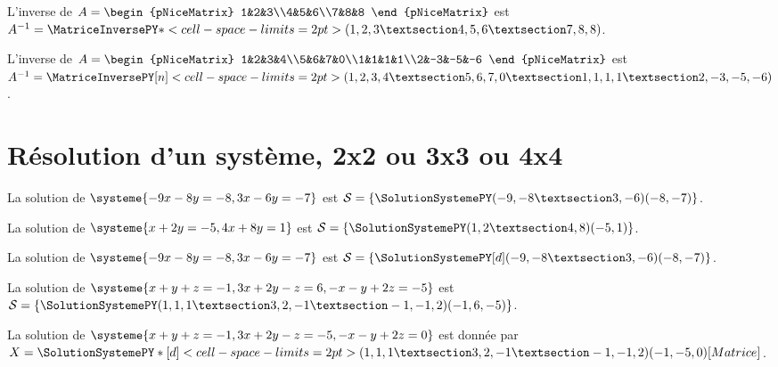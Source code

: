 \documentclass[french,a4paper,10pt]{article}
\begin{document}
\begin{ShowCodeTeX}
L'inverse de $A=\begin{pNiceMatrix} 1&2&3\\4&5&6\\7&8&8 \end{pNiceMatrix}$ est
$A^{-1}=\MatriceInversePY*<cell-space-limits=2pt>(1,2,3 § 4,5,6 § 7,8,8)$.
\end{ShowCodeTeX}

\begin{ShowCodeTeX}
L'inverse de $A=\begin{pNiceMatrix} 1&2&3&4\\5&6&7&0\\1&1&1&1\\2&-3&-5&-6 \end{pNiceMatrix}$
est $A^{-1}=\MatriceInversePY[n]<cell-space-limits=2pt>(1,2,3,4 § 5,6,7,0 § 1,1,1,1 § 2,-3,-5,-6)$.
\end{ShowCodeTeX}

\section{Résolution d'un système, 2x2 ou 3x3 ou 4x4}

\begin{ShowCodeTeX}
La solution de $\systeme{-9x-8y=-8,3x-6y=-7}$ est $\mathcal{S}=%
\left\lbrace \SolutionSystemePY(-9,-8 § 3,-6)(-8,-7) \right\rbrace$.
\end{ShowCodeTeX}

\begin{ShowCodeTeX}
La solution de $\systeme{x+2y=-5,4x+8y=1}$ est $\mathcal{S}=%
\left\lbrace \SolutionSystemePY(1,2 § 4,8)(-5,1) \right\rbrace$.
\end{ShowCodeTeX}

\begin{ShowCodeTeX}
La solution de $\systeme{-9x-8y=-8,3x-6y=-7}$ est $\mathcal{S}=%
\left\lbrace \SolutionSystemePY[d](-9,-8 § 3,-6)(-8,-7) \right\rbrace$.
\end{ShowCodeTeX}

\begin{ShowCodeTeX}
La solution de $\systeme{x+y+z=-1,3x+2y-z=6,-x-y+2z=-5}$ est $\mathcal{S}=%
\left\lbrace \SolutionSystemePY(1,1,1 § 3,2,-1 § -1,-1,2)(-1,6,-5) \right\rbrace$.
\end{ShowCodeTeX}

\begin{ShowCodeTeX}
La solution de $\systeme{x+y+z=-1,3x+2y-z=-5,-x-y+2z=0}$ est donnée par $X=%
\SolutionSystemePY*[d]<cell-space-limits=2pt>(1,1,1 § 3,2,-1 § -1,-1,2)(-1,-5,0)[Matrice]$.
\end{ShowCodeTeX}
\end{document}
